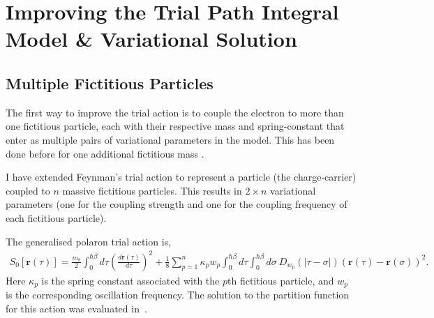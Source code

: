 \chapter{Improving the Trial Path Integral Model \& Variational Solution}
\label{chap:fourth}



\section{Multiple Fictitious Particles}
\label{sec:chap-fourth-first}

The first way to improve the trial action is to couple the electron to more than one fictitious particle, each with their respective mass and spring-constant that enter as multiple pairs of variational parameters in the model. This has been done before for one additional fictitious mass \cite{abe_improvement_1971}. 

I have extended Feynman's trial action to represent a particle (the charge-carrier) coupled to $n$ massive fictitious particles. This results in $2 \times n$ variational parameters (one for the coupling strength and one for the coupling frequency of each fictitious particle).

The generalised polaron trial action is,
\begin{equation} \label{eqn:multi_trial_action}
    \begin{gathered}
        S_{0}[\mathbf{r}(\tau)] =
        \frac{m_b}{2}\int^{\hbar \beta}_0 d\tau \left(\frac{d\mathbf{r}(\tau)}{d\tau}\right)^2 +
        \frac{1}{8} \sum_{p = 1}^n \kappa_{p} w_{p} \int^{\hbar\beta}_0 d\tau \int^{\hbar\beta}_0 d\sigma\ D_{w_p}(|\tau - \sigma|) (\mathbf{r}(\tau) - \mathbf{r}(\sigma))^{2} .
    \end{gathered}
\end{equation}
Here $\kappa_{p}$ is the spring constant associated with the $p$th fictitious particle, and $w_{p}$ is the corresponding oscillation frequency. The solution to the partition function for this action was evaluated in~\cite{poulter_complete_1992}.
\newline

